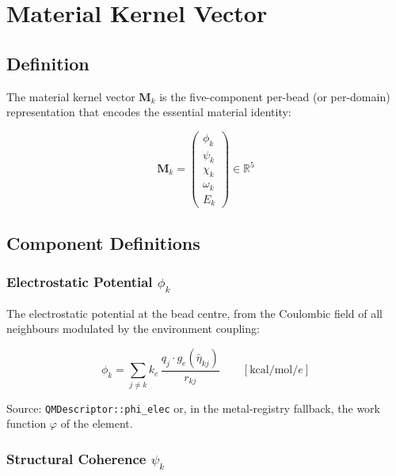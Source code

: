 \documentclass[11pt, a4paper, oneside]{article}
\newcommand{\field}[1]{\texttt{#1}}
\newcommand{\kcal}{\text{kcal/mol}}
\begin{document}
\section{Material Kernel Vector}
\label{sec:kernel}

\subsection{Definition}

The material kernel vector $\mathbf{M}_k$ is the five-component
per-bead (or per-domain) representation that encodes the essential
material identity:

\begin{equation}
\boxed{
\mathbf{M}_k
= \begin{pmatrix}
  \phi_k \\[3pt]
  \psi_k \\[3pt]
  \chi_k \\[3pt]
  \omega_k \\[3pt]
  E_k
\end{pmatrix}
\in \mathbb{R}^5
}
\label{eq:Mk}
\end{equation}

\subsection{Component Definitions}

\subsubsection{Electrostatic Potential \texorpdfstring{$\phi_k$}{φ\_k}}

The electrostatic potential at the bead centre, from the Coulombic field
of all neighbours modulated by the environment coupling:

\begin{equation}
\phi_k = \sum_{j \neq k}
  k_e \, \frac{q_j \cdot g_e(\bar\eta_{kj})}{r_{kj}}
\qquad [\kcal/e]
\label{eq:phi}
\end{equation}

Source: \field{QMDescriptor::phi\_elec} or, in the metal-registry
fallback, the work function $\varphi$ of the element.

\subsubsection{Structural Coherence
  \texorpdfstring{$\psi_k$}{ψ\_k}}
\end{document}
